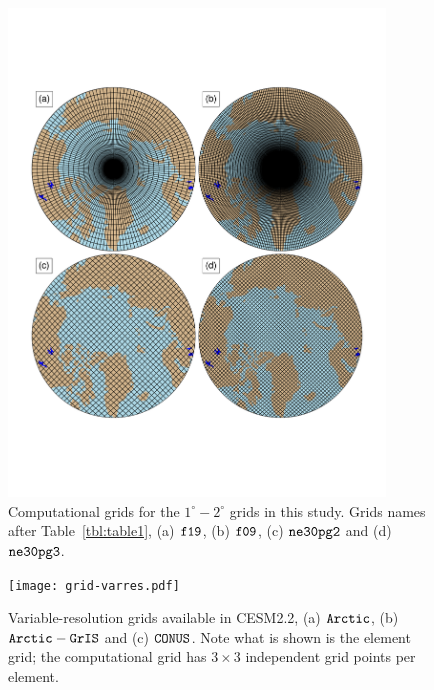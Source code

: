 \documentclass[draft]{agujournal2019}
\begin{document}
\begin{figure}[t]
\begin{center}
         \includegraphics[width=100mm]{grid-uniform}
\end{center}
\caption{Computational grids for the $1^{\circ}-2^{\circ}$ {\color{blue}{lat-lon and quasi-uniform unstructured}} grids in this study. Grids names after Table~\ref{tbl:table1}, (a) $\tt f19$, (b) $\tt f09$, (c) $\tt ne30pg2$ and (d) $\tt ne30pg3$.}
\label{fig:uni-grids}
\end{figure}

\begin{figure}[t]
\begin{center}
         \texttt{[image: grid-varres.pdf]}
\end{center}
\caption{Variable-resolution grids available in CESM2.2, (a) $\tt Arctic$, (b) $\tt Arctic-GrIS$ and (c) $\tt CONUS$. Note what is shown is the element grid; the computational grid has $3\times3$ independent grid points per element.}
\label{fig:vr-grids}
\end{figure}
\end{document}
